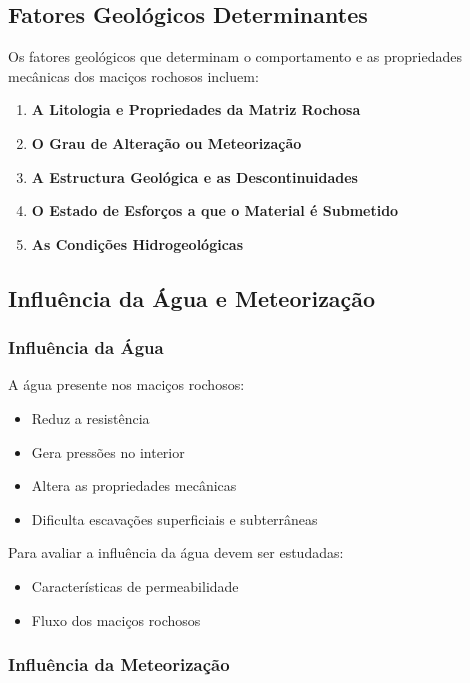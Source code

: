 \documentclass[12pt,a4paper,twoside]{book}
\begin{document}
\subsection{Fatores Geológicos Determinantes}

Os fatores geológicos que determinam o comportamento e as propriedades mecânicas dos maciços 
rochosos incluem:

\begin{enumerate}
    \item \textbf{A Litologia e Propriedades da Matriz Rochosa}
    \item \textbf{O Grau de Alteração ou Meteorização}
    \item \textbf{A Estructura Geológica e as Descontinuidades}
    \item \textbf{O Estado de Esforços a que o Material é Submetido}
    \item \textbf{As Condições Hidrogeológicas}
\end{enumerate}

\subsection{Influência da Água e Meteorização}

\subsubsection{Influência da Água}

A água presente nos maciços rochosos:
\begin{itemize}
    \item Reduz a resistência
    \item Gera pressões no interior
    \item Altera as propriedades mecânicas
    \item Dificulta escavações superficiais e subterrâneas
\end{itemize}

Para avaliar a influência da água devem ser estudadas:
\begin{itemize}
    \item Características de permeabilidade
    \item Fluxo dos maciços rochosos
\end{itemize}

\subsubsection{Influência da Meteorização}
\end{document}
